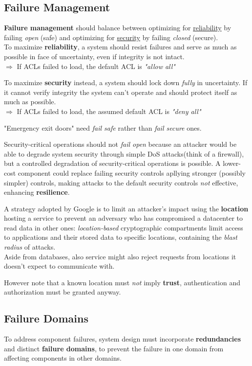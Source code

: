 \subsection{Failure Management}
\textbf{Failure management} should balance between optimizing for \underline{reliability} by failing
\textit{open} (safe) and optimizing for \underline{security} by failing \textit{closed} (secure).\\
To maximize \textbf{reliability}, a system should resist failures and serve as much as possible in face of uncertainty, even if integrity is not intact.\\
$\Longrightarrow$ If ACLs failed to load, the default ACL is \textit{"allow all"}

To maximize \textbf{security} instead, a system should lock down \textit{fully} in uncertainty.
If it cannot verify integrity the system can’t operate and should protect itself as much as possible.\\
$\Longrightarrow$ If ACLs failed to load, the assumed default ACL is \textit{"deny all"}
\begin{center}
   "Emergency exit doors" need \textit{fail safe} rather than \textit{fail secure} ones.
\end{center}

Security-critical operations should not \textit{fail open} because an attacker would be able to degrade system security through simple DoS attacks(think of a firewall),
but a controlled degradation of security-critical operations is possible.
A lower-cost component could replace failing security controls apllying stronger (possibly simpler) controls, making attacks to the default security controls \textit{not} effective, enhancing \textbf{resilience}.
\nl

A strategy adopted by Google is to limit an attacker’s impact using the \textbf{location} hosting a service to prevent
an adversary who has compromised a datacenter to read data in other ones:
\textit{location-based} cryptographic compartments limit access to applications and
their stored data to specific locations, containing the \textit{blast radius} of attacks.\\
Aside from databases, also service might also reject requests from locations it doesn’t expect to
communicate with.

However note that a known location must \textit{not} imply \textbf{trust}, authentication and authorization must be granted anyway.

\subsection{Failure Domains}
To address component failures, 
system design must incorporate \textbf{redundancies} and distinct
\textbf{failure domains},
to prevent the failure in one domain from affecting components in other domains.

